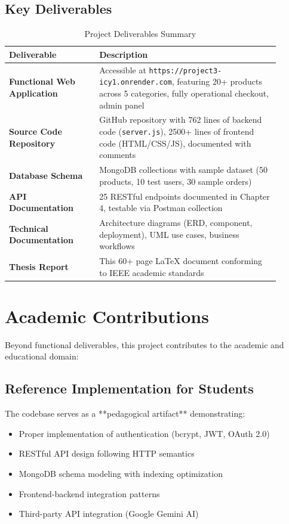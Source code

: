 \subsection{Key Deliverables}

\begin{table}[H]
\centering
\caption{Project Deliverables Summary}
\label{tab:deliverables_summary}
\begin{tabular}{@{}p{0.30\linewidth}p{0.60\linewidth}@{}}
\toprule
\textbf{Deliverable} & \textbf{Description} \\
\midrule
\textbf{Functional Web Application} & Accessible at \texttt{https://project3-icy1.onrender.com}, featuring 20+ products across 5 categories, fully operational checkout, admin panel \\
\textbf{Source Code Repository} & GitHub repository with 762 lines of backend code (\texttt{server.js}), 2500+ lines of frontend code (HTML/CSS/JS), documented with comments \\
\textbf{Database Schema} & MongoDB collections with sample dataset (50 products, 10 test users, 30 sample orders) \\
\textbf{API Documentation} & 25 RESTful endpoints documented in Chapter 4, testable via Postman collection \\
\textbf{Technical Documentation} & Architecture diagrams (ERD, component, deployment), UML use cases, business workflows \\
\textbf{Thesis Report} & This 60+ page LaTeX document conforming to IEEE academic standards \\
\bottomrule
\end{tabular}
\end{table}

\section{Academic Contributions}

Beyond functional deliverables, this project contributes to the academic and educational domain:

\subsection{Reference Implementation for Students}

The codebase serves as a **pedagogical artifact** demonstrating:
\begin{itemize}
    \item Proper implementation of authentication (bcrypt, JWT, OAuth 2.0)
    \item RESTful API design following HTTP semantics
    \item MongoDB schema modeling with indexing optimization
    \item Frontend-backend integration patterns
    \item Third-party API integration (Google Gemini AI)
\end{itemize}

